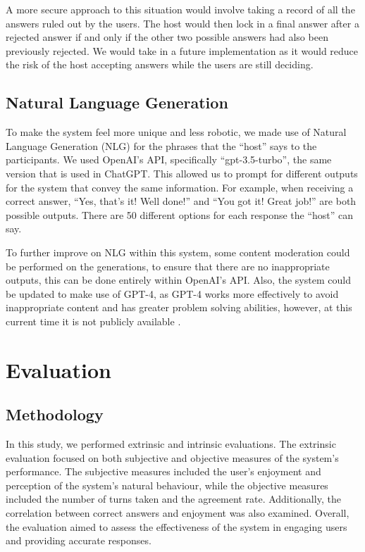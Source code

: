 \documentclass[hidelinks, 11pt]{article}
\begin{document}
A more secure approach to this situation would involve taking a record of all the answers ruled out by the users. The host would then lock in a final answer after a rejected answer if and only if the other two possible answers had also been previously rejected. We would take in a future implementation as it would reduce the risk of the host accepting answers while the users are still deciding.

\subsection{Natural Language Generation}
\label{subsec:nlg}

To make the system feel more unique and less robotic, we made use of Natural Language Generation (NLG) for the phrases that the “host” says to the participants. We used OpenAI's API, specifically “gpt-3.5-turbo”, the same version that is used in ChatGPT. This allowed us to prompt for different outputs for the system that convey the same information. For example, when receiving a correct answer, “Yes, that's it! Well done!” and “You got it! Great job!” are both possible outputs. There are 50 different options for each response the “host” can say.

To further improve on NLG within this system, some content moderation could be performed on the generations, to ensure that there are no inappropriate outputs, this can be done entirely within OpenAI's API.  Also, the system could be updated to make use of GPT-4, as GPT-4 works more effectively to avoid inappropriate content and has greater problem solving abilities, however, at this current time it is not publicly available \cite{GPT_4_2023,OpenAI_2023}.


\section{Evaluation}
\label{sec:evaluation}

\subsection{Methodology}
\label{subsec:methodology}
In this study, we performed extrinsic and intrinsic evaluations. The extrinsic evaluation focused on both subjective and objective measures of the system's performance. The subjective measures included the user's enjoyment and perception of the system's natural behaviour, while the objective measures included the number of turns taken and the agreement rate. Additionally, the correlation between correct answers and enjoyment was also examined. Overall, the evaluation aimed to assess the effectiveness of the system in engaging users and providing accurate responses.
\end{document}
